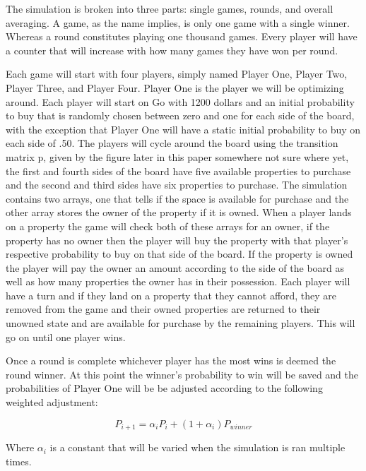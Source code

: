 \documentclass{article}
\begin{document}
The simulation is broken into three parts: single games, rounds, and overall averaging.  A game, as the name implies, is only one game with a single winner.  Whereas a round constitutes playing one thousand games.  Every player will have a counter that will increase with how many games they have won per round.

Each game will start with four players, simply named Player One, Player Two, Player Three, and Player Four.  Player One is the player we will be optimizing around.  Each player will start on Go with 1200 dollars and an initial probability to buy that is randomly chosen between zero and one for each side of the board, with the exception that Player One will have a static initial probability to buy on each side of .50.  The players will cycle around the board using the transition matrix p, given by the figure later in this paper somewhere not sure where yet, the first and fourth sides of the board have five available properties to purchase and the second and third sides have six properties to purchase.  The simulation contains two arrays, one that tells if the space is available for purchase and the other array stores the owner of the property if it is owned.  When a player lands on a property the game will check both of these arrays for an owner, if the property has no owner then the player will buy the property with that player’s respective probability to buy on that side of the board.  If the property is owned the player will pay the owner an amount according to the side of the board as well as how many properties the owner has in their possession.  Each player will have a turn and if they land on a property that they cannot afford, they are removed from the game and their owned properties are returned to their unowned state and are available for purchase by the remaining players.  This will go on until one player wins.  

Once a round is complete whichever player has the most wins is deemed the round winner.  At this point the winner’s probability to win will be saved and the probabilities of Player One will be be adjusted according to the following weighted adjustment:

\begin{equation}
    \label{probability_adjustment}
    P_{i+1} = \alpha_i P_i + (1+\alpha_i)P_{winner}
\end{equation}

Where $\alpha_i$ is a constant that will be varied when the simulation is ran multiple times.
\end{document}
